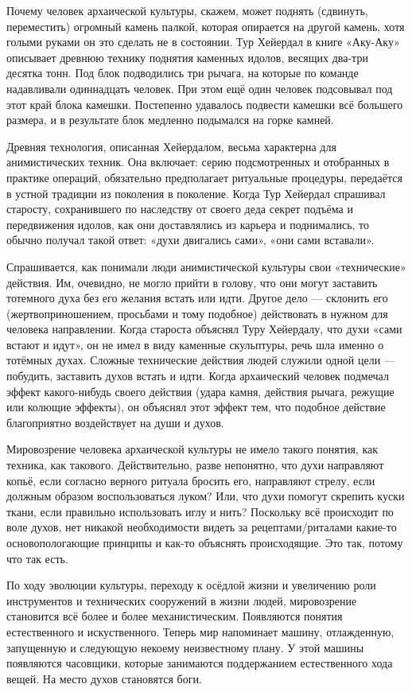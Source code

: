 \documentclass[a4paper]{article}
\begin{document}
{Почему человек архаической культуры, скажем, может поднять (сдвинуть, переместить) огромный камень палкой, которая опирается на другой камень, хотя голыми руками он это сделать не в состоянии. Тур Хейердал в книге «Аку-Аку» описывает древнюю технику поднятия каменных идолов, весящих два-три десятка тонн. Под блок подводились три рычага, на которые по команде надавливали одиннадцать человек. При этом ещё один человек подсовывал под этот край блока камешки. Постепенно удавалось подвести камешки всё большего размера, и в результате блок медленно подымался на горке камней.

Древняя технология, описанная Хейердалом, весьма характерна для анимистических техник. Она включает: серию подсмотренных и отобранных в практике операций, обязательно предполагает ритуальные процедуры, передаётся в устной традиции из поколения в поколение. Когда Тур Хейердал спрашивал старосту, сохранившего по наследству от своего деда секрет подъёма и передвижения идолов, как они доставлялись из карьера и поднимались, то обычно получал такой ответ: «духи двигались сами», «они сами вставали». 

Спрашивается, как понимали люди анимистической культуры свои «технические» действия. Им, очевидно, не могло прийти в голову, что они могут заставить тотемного духа без его желания встать или идти. Другое дело — склонить его (жертвоприношением, просьбами и тому подобное) действовать в нужном для человека направлении. Когда староста объяснял Туру Хейердалу, что духи «сами встают и идут», он не имел в виду каменные скульптуры, речь шла именно о тотёмных духах. Сложные технические действия людей служили одной цели — побудить, заставить духов встать и идти. Когда архаический человек подмечал эффект какого-нибудь своего действия (удара камня, действия рычага, режущие или колющие эффекты), он объяснял этот эффект тем, что подобное действие благоприятно воздействует на души и духов.

Мировозрение человека архаической культуры не имело такого понятия, как техника, как такового. Действительно, разве непонятно, что духи направляют копьё, если согласно верного ритуала бросить его, направляют стрелу, если должным образом воспользоваться луком? Или, что духи помогут скрепить куски ткани, если правильно использовать иглу и нить? Поскольку всё происходит по воле духов, нет никакой необходимости видеть за рецептами/риталами какие-то основопологающие принципы и как-то объяснять происходящие. Это так, потому что так есть.

По ходу эволюции культуры, переходу к осёдлой жизни и увеличению роли инструментов и технических сооружений в жизни людей, мировозрение становится всё более и более механистическим. Появляются понятия естественного и искуственного. Теперь мир напоминает машину, отлажденную, запущенную и следующую некоему неизвестному плану. У этой машины появляются часовщики, которые занимаются поддержанием естественного хода вещей. На место духов становятся боги.

}
\end{document}

